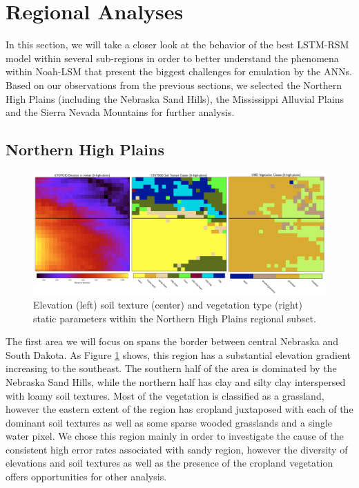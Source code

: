 \section{Regional Analyses}

In this section, we will take a closer look at the behavior of the best LSTM-RSM model within several sub-regions in order to better understand the phenomena within Noah-LSM that present the biggest challenges for emulation by the ANNs. Based on our observations from the previous sections, we selected the Northern High Plains (including the Nebraska Sand Hills), the Mississippi Alluvial Plains and the Sierra Nevada Mountains for further analysis.

\subsection{Northern High Plains}

\begin{figure}[h!]
    \centering

    \includegraphics[width=.99\linewidth,draft=false]{figures/lt-static/static_all-3_high-plains.png}

    \caption{Elevation (left) soil texture (center) and vegetation type (right) static parameters within the Northern High Plains regional subset.}
    \label{lt_static_high-plains}
\end{figure}

The first area we will focus on spans the border between central Nebraska and South Dakota. As Figure \ref{lt_static_high-plains} shows, this region has a substantial elevation gradient increasing to the southeast. The southern half of the area is dominated by the Nebraska Sand Hills, while the northern half has clay and silty clay interspersed with loamy soil textures. Most of the vegetation is classified as a grassland, however the eastern extent of the region has cropland juxtaposed with each of the dominant soil textures as well as some sparse wooded grasslands and a single water pixel. We chose this region mainly in order to investigate the cause of the consistent high error rates associated with sandy region, however the diversity of elevations and soil textures as well as the presence of the cropland vegetation offers opportunities for other analysis.

